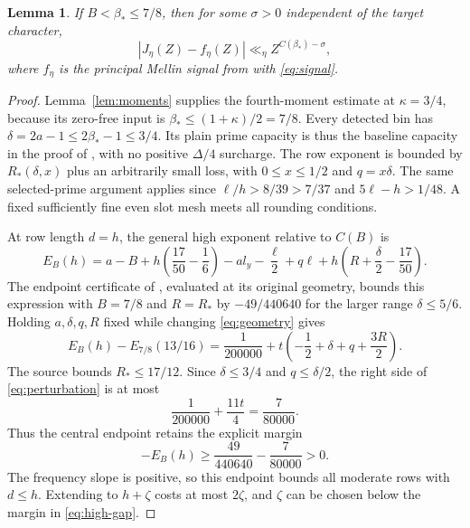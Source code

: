 \documentclass[11pt]{article}
\newtheorem{lemma}[theorem]{Lemma}
\begin{document}
\begin{lemma}\label{lem:high}
If $B<\beta_*\le7/8$, then for
some $\sigma>0$ independent of the
target character,
\[
       |J_\eta(Z)-f_\eta(Z)|
          \ll_\eta Z^{C(\beta_*)-\sigma},
\]
where $f_\eta$ is the principal Mellin signal from \cite{OAI} with
\eqref{eq:signal}.
\end{lemma}

\begin{proof}
Lemma~\ref{lem:moments} supplies the fourth-moment estimate at $\kappa=3/4$, because its
zero-free input is $\beta_*\le(1+\kappa)/2=7/8$. Every detected bin has
$\delta=2a-1\le2\beta_*-1\le3/4$. Its plain prime capacity is thus
the baseline capacity in the proof of \cite[Part II, capacity
comparison]{OAI}, with no positive $\Delta/4$ surcharge.
The row exponent is bounded by $R_*(\delta,x)$ plus an arbitrarily small
loss, with $0\le x\le1/2$ and $q=x\delta$. The same selected-prime
argument applies since $\ell/h>8/39>7/37$ and
$5\ell-h>1/48$. A fixed sufficiently fine even slot mesh meets all
rounding conditions.

At row length $d=h$, the general high exponent relative to $C(B)$ is
\begin{equation}\label{eq:high-exponent}
 E_B(h)=a-B+h\left(\frac{17}{50}-\frac16\right)
       -a l_y-\frac\ell2+q\ell
       +h\left(R+\frac\delta2-\frac{17}{50}\right).
\end{equation}
The endpoint certificate of \cite[Part II, compensated endpoint
certificate]{OAI}, evaluated at
its original geometry, bounds this expression with $B=7/8$ and $R=R_*$
by $-49/440640$ for the larger range $\delta\le5/6$.
Holding $a,\delta,q,R$ fixed while changing \eqref{eq:geometry} gives
\begin{equation}\label{eq:perturbation}
 E_B(h)-E_{7/8}(13/16)
 =\frac1{200000}
       +t\left(-\frac12+\delta+q+\frac{3R}{2}\right).
\end{equation}
The source bounds $R_*\le17/12$. Since $\delta\le3/4$ and
$q\le\delta/2$, the right side of \eqref{eq:perturbation} is at most
\[
 \frac1{200000}+\frac{11t}{4}=\frac7{80000}.
\]
Thus the central endpoint retains the explicit margin
\begin{equation}\label{eq:high-gap}
 -E_B(h)\ge\frac{49}{440640}-\frac7{80000}>0.
\end{equation}
The frequency slope is positive, so this endpoint bounds all moderate
rows with $d\le h$. Extending to $h+\zeta$ costs at most $2\zeta$, and
$\zeta$ can be chosen below the margin in \eqref{eq:high-gap}.


\end{proof}
\end{document}
